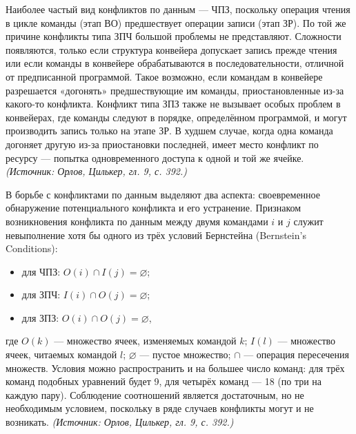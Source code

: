 \documentclass[a4paper,12pt]{article}
\begin{document}
Наиболее частый вид конфликтов по данным --- ЧПЗ, поскольку операция чтения в цикле команды (этап ВО) предшествует операции записи (этап ЗР). По той же причине конфликты типа ЗПЧ большой проблемы не представляют. Сложности появляются, только если структура конвейера допускает запись прежде чтения или если команды в конвейере обрабатываются в последовательности, отличной от предписанной программой. Такое возможно, если командам в конвейере разрешается «догонять» предшествующие им команды, приостановленные из-за какого-то конфликта. Конфликт типа ЗПЗ также не вызывает особых проблем в конвейерах, где команды следуют в порядке, определённом программой, и могут производить запись только на этапе ЗР. В худшем случае, когда одна команда догоняет другую из-за приостановки последней, имеет место конфликт по ресурсу --- попытка одновременного доступа к одной и той же ячейке.
\textit{(Источник: Орлов, Цилькер, гл. 9, с. 392.)}

В борьбе с конфликтами по данным выделяют два аспекта: своевременное обнаружение потенциального конфликта и его устранение. Признаком возникновения конфликта по данным между двумя командами \(i\) и \(j\) служит невыполнение хотя бы одного из трёх условий Бернстейна (Bernstein's Conditions):
\begin{itemize}
\item для ЧПЗ: \(O(i)\cap I(j)=\varnothing\);
\item для ЗПЧ: \(I(i)\cap O(j)=\varnothing\);
\item для ЗПЗ: \(O(i)\cap O(j)=\varnothing\),
\end{itemize}
где \(O(k)\) --- множество ячеек, изменяемых командой \(k\); \(I(l)\) --- множество ячеек, читаемых командой \(l\); \(\varnothing\) --- пустое множество; \(\cap\) --- операция пересечения множеств. Условия можно распространить и на большее число команд: для трёх команд подобных уравнений будет 9, для четырёх команд --- 18 (по три на каждую пару). Соблюдение соотношений является достаточным, но не необходимым условием, поскольку в ряде случаев конфликты могут и не возникать.
\textit{(Источник: Орлов, Цилькер, гл. 9, с. 392.)}
\end{document}
